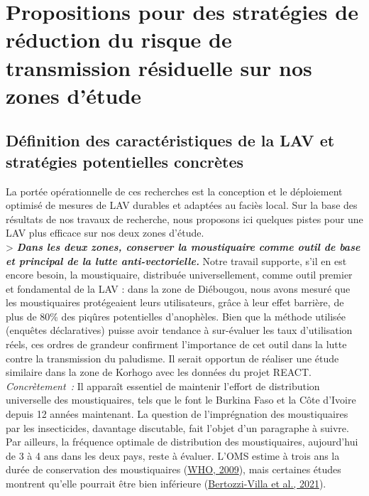 \documentclass[12pt,twoside]{reedthesis}
\begin{document}
\hypertarget{propositions-pour-des-stratuxe9gies-de-ruxe9duction-du-risque-de-transmission-ruxe9siduelle-sur-nos-zones-duxe9tude}{%
\section{Propositions pour des stratégies de réduction du risque de transmission résiduelle sur nos zones d'étude}\label{propositions-pour-des-stratuxe9gies-de-ruxe9duction-du-risque-de-transmission-ruxe9siduelle-sur-nos-zones-duxe9tude}}

\hypertarget{duxe9finition-des-caractuxe9ristiques-de-la-lav-et-stratuxe9gies-potentielles-concruxe8tes}{%
\subsection{Définition des caractéristiques de la LAV et stratégies potentielles concrètes}\label{duxe9finition-des-caractuxe9ristiques-de-la-lav-et-stratuxe9gies-potentielles-concruxe8tes}}

La portée opérationnelle de ces recherches est la conception et le déploiement optimisé de mesures de LAV durables et adaptées au faciès local. Sur la base des résultats de nos travaux de recherche, nous proposons ici quelques pistes pour une LAV plus efficace sur nos deux zones d'étude.\\

\textgreater{} \textbf{\emph{Dans les deux zones, conserver la moustiquaire comme outil de base et principal de la lutte anti-vectorielle.}} Notre travail supporte, s'il en est encore besoin, la moustiquaire, distribuée universellement, comme outil premier et fondamental de la LAV : dans la zone de Diébougou, nous avons mesuré que les moustiquaires protégeaient leurs utilisateurs, grâce à leur effet barrière, de plus de 80\% des piqûres potentielles d'anophèles. Bien que la méthode utilisée (enquêtes déclaratives) puisse avoir tendance à sur-évaluer les taux d'utilisation réels, ces ordres de grandeur confirment l'importance de cet outil dans la lutte contre la transmission du paludisme. Il serait opportun de réaliser une étude similaire dans la zone de Korhogo avec les données du projet REACT.\\

\emph{Concrètement~:} Il apparaît essentiel de maintenir l'effort de distribution universelle des moustiquaires, tels que le font le Burkina Faso et la Côte d'Ivoire depuis 12 années maintenant. La question de l'imprégnation des moustiquaires par les insecticides, davantage discutable, fait l'objet d'un paragraphe à suivre. Par ailleurs, la fréquence optimale de distribution des moustiquaires, aujourd'hui de 3 à 4 ans dans les deux pays, reste à évaluer. L'OMS estime à trois ans la durée de conservation des moustiquaires (\protect\hyperlink{ref-10665-69986}{WHO, 2009}), mais certaines études montrent qu'elle pourrait être bien inférieure (\protect\hyperlink{ref-bertozzi-villa_maps_2021}{Bertozzi-Villa et al., 2021}).\\
\end{document}
